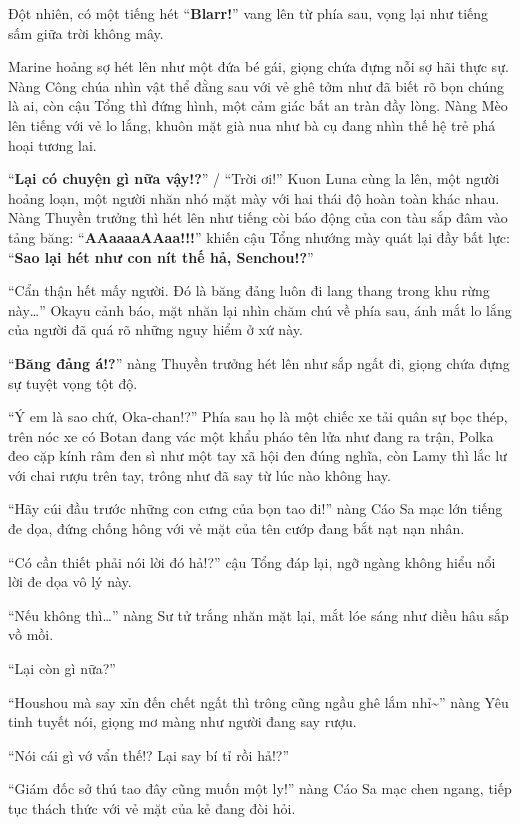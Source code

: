 \documentclass[../main.tex]{subfiles}
\begin{document}
Đột nhiên, có một tiếng hét ``\textbf{Blarr!}'' vang lên từ phía sau, vọng lại như tiếng sấm giữa trời không mây.

Marine hoảng sợ hét lên như một đứa bé gái, giọng chứa đựng nỗi sợ hãi thực sự. Nàng Công chúa nhìn vật thể đằng sau với vẻ ghê tởm như đã biết rõ bọn chúng là ai, còn cậu Tổng thì đứng hình, một cảm giác bất an tràn đầy lòng. Nàng Mèo lên tiếng với vẻ lo lắng, khuôn mặt già nua như bà cụ đang nhìn thế hệ trẻ phá hoại tương lai.

``\textbf{Lại có chuyện gì nữa vậy!?}'' / ``Trời ơi!'' Kuon Luna cùng la lên, một người hoảng loạn, một người nhăn nhó mặt mày với hai thái độ hoàn toàn khác nhau. Nàng Thuyền trưởng thì hét lên như tiếng còi báo động của con tàu sắp đâm vào tảng băng: ``\textbf{AAaaaaAAaa!!!}'' khiến cậu Tổng nhướng mày quát lại đầy bất lực: ``\textbf{Sao lại hét như con nít thế hả, Senchou!?}''

``Cẩn thận hết mấy người. Đó là băng đảng luôn đi lang thang trong khu rừng này\dots'' Okayu cảnh báo, mặt nhăn lại nhìn chăm chú về phía sau, ánh mắt lo lắng của người đã quá rõ những nguy hiểm ở xứ này.

``\textbf{Băng đảng á!?}'' nàng Thuyền trưởng hét lên như sắp ngất đi, giọng chứa đựng sự tuyệt vọng tột độ.

``Ý em là sao chứ, Oka-chan!?''
Phía sau họ là một chiếc xe tải quân sự bọc thép, trên nóc xe có Botan đang vác một khẩu pháo tên lửa như đang ra trận, Polka đeo cặp kính râm đen sì như một tay xã hội đen đúng nghĩa, còn Lamy thì lắc lư với chai rượu trên tay, trông như đã say từ lúc nào không hay.


``Hãy cúi đầu trước những con cưng của bọn tao đi!'' nàng Cáo Sa mạc lớn tiếng đe dọa, đứng chống hông với vẻ mặt của tên cướp đang bắt nạt nạn nhân.

``Có cần thiết phải nói lời đó hả!?'' cậu Tổng đáp lại, ngỡ ngàng không hiểu nổi lời đe dọa vô lý này.

``Nếu không thì\dots'' nàng Sư tử trắng nhăn mặt lại, mắt lóe sáng như diều hâu sắp vồ mồi.

``Lại còn gì nữa?''

``Houshou mà say xỉn đến chết ngất thì trông cũng ngầu ghê lắm nhỉ\~{}'' nàng Yêu tinh tuyết nói, giọng mơ màng như người đang say rượu.

``Nói cái gì vớ vẩn thế!? Lại say bí tỉ rồi hả!?''

``Giám đốc sở thú tao đây cũng muốn một ly!'' nàng Cáo Sa mạc chen ngang, tiếp tục thách thức với vẻ mặt của kẻ đang đòi hỏi.
\end{document}
